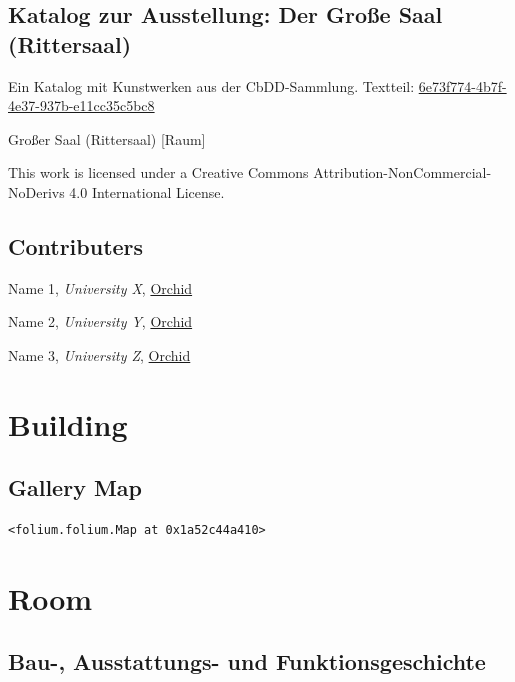 \documentclass[
  a4paper,
  openany]{book}
\begin{document}
\tableofcontents
{\let\newpage\relax}

\mainmatter
{}

\chapter{Katalog zur Ausstellung: Der Große Saal
(Rittersaal)}\label{katalog-zur-ausstellung-der-grouxdfe-saal-rittersaal}

Ein Katalog mit Kunstwerken aus der CbDD-Sammlung. Textteil:
\href{https://www.deckenmalerei.eu/42d06165-58e7-4653-bfe4-3d5f7091fc33\#6e73f774-4b7f-4e37-937b-e11cc35c5bc8}{6e73f774-4b7f-4e37-937b-e11cc35c5bc8}

Großer Saal (Rittersaal) {[}Raum{]}

This work is licensed under a Creative Commons
Attribution-NonCommercial-NoDerivs 4.0 International License.


\chapter{Contributers}\label{contributers}

Name 1, \emph{University X}, \href{https://orcid.org/}{Orchid}

Name 2, \emph{University Y}, \href{https://orcid.org/}{Orchid}

Name 3, \emph{University Z}, \href{https://orcid.org/}{Orchid}

\part{Building}

\chapter{Gallery Map}\label{gallery-map}

\begin{verbatim}
<folium.folium.Map at 0x1a52c44a410>
\end{verbatim}

\part{Room}

\chapter{Bau-, Ausstattungs- und
Funktionsgeschichte}\label{bau--ausstattungs--und-funktionsgeschichte}
\end{document}
